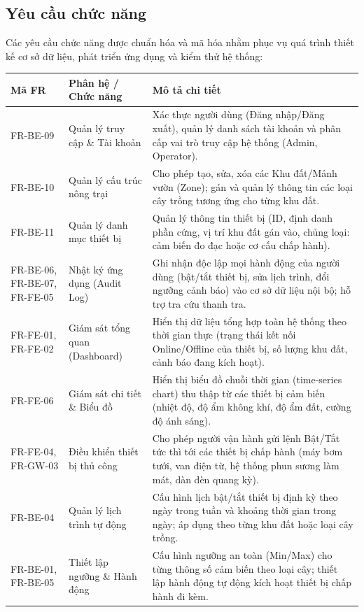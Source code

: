 \subsection{Yêu cầu chức năng}

Các yêu cầu chức năng được chuẩn hóa và mã hóa nhằm phục vụ quá trình thiết kế cơ sở dữ liệu, phát triển ứng dụng và kiểm thử hệ thống:

\begin{table}[H]
\centering
\small
\begin{tabularx}{\textwidth}{|l|p{3.8cm}|X|}
\hline
\textbf{Mã FR} & \textbf{Phân hệ / Chức năng} & \textbf{Mô tả chi tiết} \\ \hline
FR-BE-09 & Quản lý truy cập \& Tài khoản & Xác thực người dùng (Đăng nhập/Đăng xuất), quản lý danh sách tài khoản và phân cấp vai trò truy cập hệ thống (Admin, Operator). \\ \hline
FR-BE-10 & Quản lý cấu trúc nông trại & Cho phép tạo, sửa, xóa các Khu đất/Mảnh vườn (Zone); gán và quản lý thông tin các loại cây trồng tương ứng cho từng khu đất. \\ \hline
FR-BE-11 & Quản lý danh mục thiết bị & Quản lý thông tin thiết bị (ID, định danh phần cứng, vị trí khu đất gán vào, chủng loại: cảm biến đo đạc hoặc cơ cấu chấp hành). \\ \hline
FR-BE-06, FR-BE-07, FR-FE-05 & Nhật ký ứng dụng (Audit Log) & Ghi nhận độc lập mọi hành động của người dùng (bật/tắt thiết bị, sửa lịch trình, đổi ngưỡng cảnh báo) vào cơ sở dữ liệu nội bộ; hỗ trợ tra cứu thanh tra. \\ \hline
FR-FE-01, FR-FE-02 & Giám sát tổng quan (Dashboard) & Hiển thị dữ liệu tổng hợp toàn hệ thống theo thời gian thực (trạng thái kết nối Online/Offline của thiết bị, số lượng khu đất, cảnh báo đang kích hoạt). \\ \hline
FR-FE-06 & Giám sát chi tiết \& Biểu đồ & Hiển thị biểu đồ chuỗi thời gian (time-series chart) thu thập từ các thiết bị cảm biến (nhiệt độ, độ ẩm không khí, độ ẩm đất, cường độ ánh sáng). \\ \hline
FR-FE-04, FR-GW-03 & Điều khiển thiết bị thủ công & Cho phép người vận hành gửi lệnh Bật/Tắt tức thì tới các thiết bị chấp hành (máy bơm tưới, van điện từ, hệ thống phun sương làm mát, dàn đèn quang kỳ). \\ \hline
FR-BE-04 & Quản lý lịch trình tự động & Cấu hình lịch bật/tắt thiết bị định kỳ theo ngày trong tuần và khoảng thời gian trong ngày; áp dụng theo từng khu đất hoặc loại cây trồng. \\ \hline
FR-BE-01, FR-BE-05 & Thiết lập ngưỡng \& Hành động & Cấu hình ngưỡng an toàn (Min/Max) cho từng thông số cảm biến theo loại cây; thiết lập hành động tự động kích hoạt thiết bị chấp hành đi kèm. \\ \hline

\end{tabularx}
\end{table}
